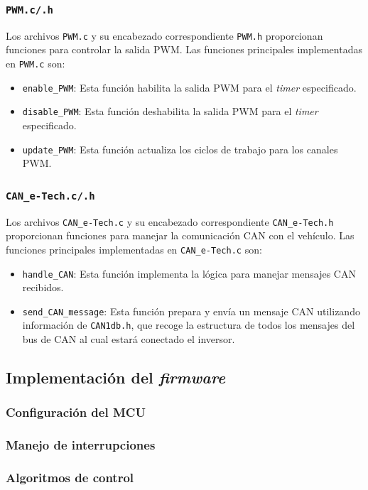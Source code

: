 \subsubsection{\texttt{PWM.c/.h}}

Los archivos \texttt{PWM.c} y su encabezado correspondiente \texttt{PWM.h} proporcionan funciones para controlar la salida PWM. Las funciones principales implementadas en \texttt{PWM.c} son:

\begin{itemize}
	\item \texttt{enable\_PWM}: Esta función habilita la salida PWM para el \textit{timer} especificado.
	\item \texttt{disable\_PWM}: Esta función deshabilita la salida PWM para el \textit{timer} especificado.
	\item \texttt{update\_PWM}: Esta función actualiza los ciclos de trabajo para los canales PWM.
\end{itemize}


\subsubsection{\texttt{CAN\_e-Tech.c/.h}}

Los archivos \texttt{CAN\_e-Tech.c} y su encabezado correspondiente \texttt{CAN\_e-Tech.h} proporcionan funciones para manejar la comunicación CAN con el vehículo. Las funciones principales implementadas en \texttt{CAN\_e-Tech.c} son:

\begin{itemize}
	\item \texttt{handle\_CAN}: Esta función implementa la lógica para manejar mensajes CAN recibidos.
	\item \texttt{send\_CAN\_message}: Esta función prepara y envía un mensaje CAN utilizando información de \texttt{CAN1db.h}, que recoge la estructura de todos los mensajes del bus de CAN al cual estará conectado el inversor.
\end{itemize}

\subsection{Implementación del \textit{firmware}}

\subsubsection{Configuración del MCU}
\subsubsection{Manejo de interrupciones}
\subsubsection{Algoritmos de control}





